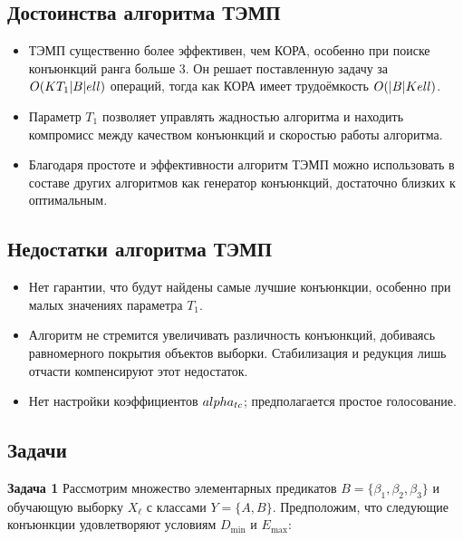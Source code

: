 \begin{itemize}
\subsection{Достоинства алгоритма ТЭМП}

\begin{itemize}
    \item ТЭМП существенно более эффективен, чем КОРА, особенно при поиске конъюнкций ранга больше 3. Он решает поставленную задачу за $O(KT_1|B|\\ell)$ операций, тогда как КОРА имеет трудоёмкость $O(|B|K\\ell)$.
    \item Параметр $T_1$ позволяет управлять жадностью алгоритма и находить компромисс между качеством конъюнкций и скоростью работы алгоритма.
    \item Благодаря простоте и эффективности алгоритм ТЭМП можно использовать в составе других алгоритмов как генератор конъюнкций, достаточно близких к оптимальным.
\end{itemize}

\subsection{Недостатки алгоритма ТЭМП}

\begin{itemize}
    \item Нет гарантии, что будут найдены самые лучшие конъюнкции, особенно при малых значениях параметра $T_1$.
    \item Алгоритм не стремится увеличивать различность конъюнкций, добиваясь равномерного покрытия объектов выборки. Стабилизация и редукция лишь отчасти компенсируют этот недостаток.
    \item Нет настройки коэффициентов $\\alpha_{tc}$; предполагается простое голосование.

\end{itemize}

\subsection{Задачи}

\textbf{Задача 1}  
Рассмотрим множество элементарных предикатов \( B = \{ \beta_1, \beta_2, \beta_3 \} \) и обучающую выборку \( X_\ell \) с классами \( Y = \{A, B\} \). Предположим, что следующие конъюнкции удовлетворяют условиям \( D_{\text{min}} \) и \( E_{\text{max}} \):


\end{itemize}
